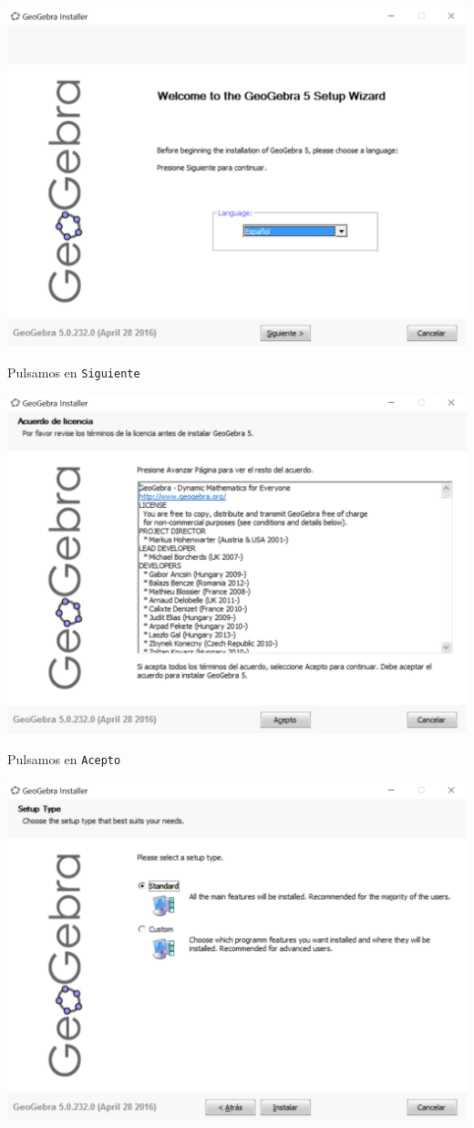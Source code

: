 \documentclass[10pt,a4paper]{article}\usepackage[]{graphicx}\usepackage[]{color}
\begin{document}
    \begin{center}
    \includegraphics[width=14cm]{../fig/Tut00-GeoGebraSetup01-201605.png}
    \end{center}
Pulsamos en {\tt Siguiente}
    \begin{center}
    \includegraphics[width=14cm]{../fig/Tut00-GeoGebraSetup02-201605.png}
    \end{center}
Pulsamos en {\tt Acepto}
    \begin{center}
    \includegraphics[width=14cm]{../fig/Tut00-GeoGebraSetup03-201605.png}
    \end{center}
\end{document}
